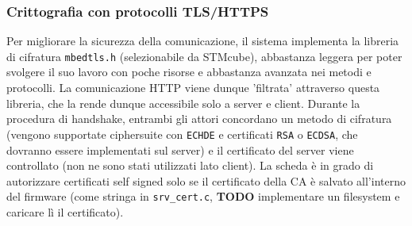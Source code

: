 \documentclass{article}
\begin{document}
\subsubsection{Crittografia con protocolli TLS/HTTPS}
Per migliorare la sicurezza della comunicazione, il sistema implementa la libreria di cifratura \texttt{mbedtls.h} (selezionabile da STMcube), abbastanza leggera per poter svolgere il suo lavoro con poche risorse e abbastanza avanzata nei metodi e protocolli. La comunicazione HTTP viene dunque 'filtrata' attraverso questa libreria, che la rende dunque accessibile solo a server e client. Durante la procedura di handshake, entrambi gli attori concordano un metodo di cifratura (vengono supportate ciphersuite con \texttt{ECHDE} e certificati \texttt{RSA} o \texttt{ECDSA}, che dovranno essere implementati sul server) e il certificato del server viene controllato (non ne sono stati utilizzati lato client). La scheda \`{e} in grado di autorizzare certificati self signed solo se il certificato della CA \`{e} salvato all'interno del firmware (come stringa in \texttt{srv\_cert.c}, \textbf{TODO} implementare un filesystem e caricare l\`{i} il certificato).
\end{document}

